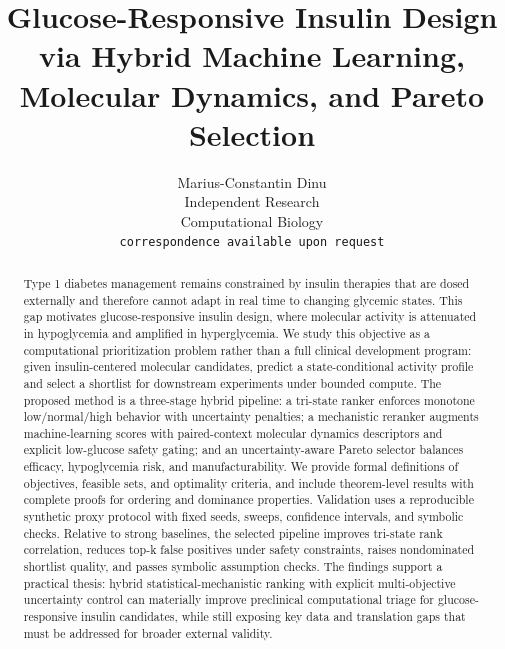 \documentclass{article} %
\title{Glucose-Responsive Insulin Design via Hybrid Machine Learning, Molecular Dynamics, and Pareto Selection}
\author{Marius-Constantin Dinu \\
Independent Research \\
Computational Biology \\
\texttt{correspondence available upon request}}
\begin{document}
\maketitle

\begin{abstract}
Type 1 diabetes management remains constrained by insulin therapies that are dosed externally and therefore cannot adapt in real time to changing glycemic states. This gap motivates glucose-responsive insulin design, where molecular activity is attenuated in hypoglycemia and amplified in hyperglycemia. We study this objective as a computational prioritization problem rather than a full clinical development program: given insulin-centered molecular candidates, predict a state-conditional activity profile and select a shortlist for downstream experiments under bounded compute. The proposed method is a three-stage hybrid pipeline: a tri-state ranker enforces monotone low/normal/high behavior with uncertainty penalties; a mechanistic reranker augments machine-learning scores with paired-context molecular dynamics descriptors and explicit low-glucose safety gating; and an uncertainty-aware Pareto selector balances efficacy, hypoglycemia risk, and manufacturability. We provide formal definitions of objectives, feasible sets, and optimality criteria, and include theorem-level results with complete proofs for ordering and dominance properties. Validation uses a reproducible synthetic proxy protocol with fixed seeds, sweeps, confidence intervals, and symbolic checks. Relative to strong baselines, the selected pipeline improves tri-state rank correlation, reduces top-k false positives under safety constraints, raises nondominated shortlist quality, and passes symbolic assumption checks. The findings support a practical thesis: hybrid statistical-mechanistic ranking with explicit multi-objective uncertainty control can materially improve preclinical computational triage for glucose-responsive insulin candidates, while still exposing key data and translation gaps that must be addressed for broader external validity.
\end{abstract}
\end{document}
